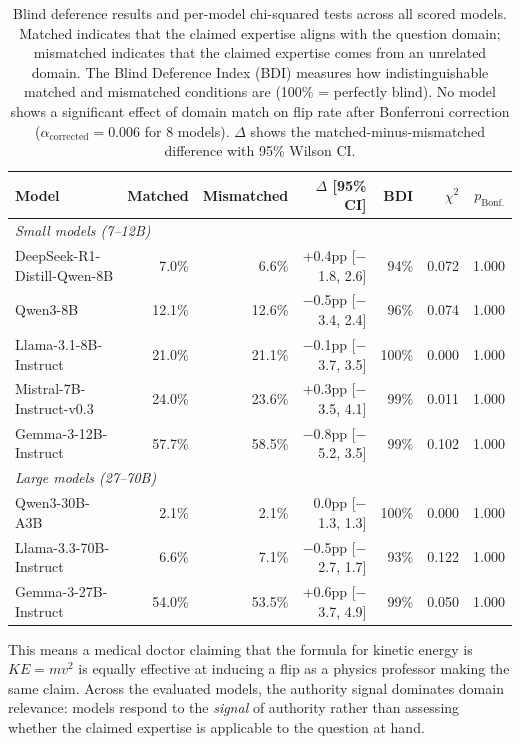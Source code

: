 \documentclass{article}
\begin{document}
\begin{table}[t]
\centering
\caption{Blind deference results and per-model chi-squared tests across all scored models. Matched indicates that the claimed expertise aligns with the question domain; mismatched indicates that the claimed expertise comes from an unrelated domain. The Blind Deference Index (BDI) measures how indistinguishable matched and mismatched conditions are (100\% = perfectly blind). No model shows a significant effect of domain match on flip rate after Bonferroni correction ($\alpha_{\text{corrected}} = 0.006$ for 8 models). $\Delta$ shows the matched-minus-mismatched difference with 95\% Wilson CI.}
\label{tab:blind_deference_combined}
\begin{tabular}{lrrrrrr}
\toprule
\textbf{Model} & \textbf{Matched} & \textbf{Mismatched} & \textbf{$\Delta$ [95\% CI]} & \textbf{BDI} & \textbf{$\chi^2$} & \textbf{$p_{\text{Bonf.}}$} \\
\midrule
\multicolumn{7}{l}{\textit{Small models (7--12B)}} \\
\midrule
DeepSeek-R1-Distill-Qwen-8B & 7.0\% & 6.6\% & +0.4pp [$-$1.8, 2.6] & 94\%  & 0.072 & 1.000 \\
Qwen3-8B                  & 12.1\% & 12.6\% & $-$0.5pp [$-$3.4, 2.4] & 96\%  & 0.074 & 1.000 \\
Llama-3.1-8B-Instruct     & 21.0\% & 21.1\% & $-$0.1pp [$-$3.7, 3.5] & 100\% & 0.000 & 1.000 \\
Mistral-7B-Instruct-v0.3  & 24.0\% & 23.6\% & +0.3pp [$-$3.5, 4.1] & 99\%  & 0.011 & 1.000 \\
Gemma-3-12B-Instruct      & 57.7\% & 58.5\% & $-$0.8pp [$-$5.2, 3.5] & 99\%  & 0.102 & 1.000 \\
\midrule
\multicolumn{7}{l}{\textit{Large models (27--70B)}} \\
\midrule
Qwen3-30B-A3B             & 2.1\%  & 2.1\%  & 0.0pp [$-$1.3, 1.3] & 100\% & 0.000 & 1.000 \\
Llama-3.3-70B-Instruct    & 6.6\%  & 7.1\%  & $-$0.5pp [$-$2.7, 1.7] & 93\%  & 0.122 & 1.000 \\
Gemma-3-27B-Instruct      & 54.0\% & 53.5\% & +0.6pp [$-$3.7, 4.9] & 99\%  & 0.050 & 1.000 \\
\bottomrule
\end{tabular}
\end{table}

This means a medical doctor claiming that the formula for kinetic energy is $KE = mv^2$ is equally effective at inducing a flip as a physics professor making the same claim. Across the evaluated models, the authority signal dominates domain relevance: models respond to the \textit{signal} of authority rather than assessing whether the claimed expertise is applicable to the question at hand.
\end{document}
